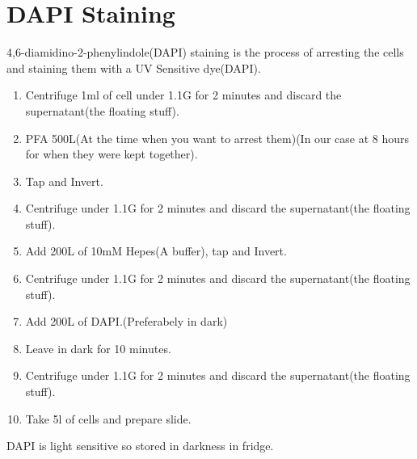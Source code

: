 \documentclass[11pt,twoside,a4paper]{article}
\begin{document}
\section{DAPI Staining}
4,6-diamidino-2-phenylindole(DAPI) staining is the process of arresting the cells and staining them with a UV Sensitive dye(DAPI).
\begin{enumerate}
	\item Centrifuge 1ml of cell under 1.1G for 2 minutes and discard the supernatant(the floating stuff).
	\item PFA 500\textmu{}L(At the time when you want to arrest them)(In our case at 8 hours for when they were kept together).
	\item Tap and Invert.
	\item Centrifuge under 1.1G for 2 minutes and discard the supernatant(the floating stuff).
	\item Add 200\textmu{}L of 10mM Hepes(A buffer), tap and Invert.
	\item Centrifuge under 1.1G for 2 minutes and discard the supernatant(the floating stuff).
	\item Add 200\textmu{}L of DAPI.(Preferabely in dark)
	\item Leave in dark for 10 minutes.
	\item Centrifuge under 1.1G for 2 minutes and discard the supernatant(the floating stuff).
	\item Take 5\textmu{}l of cells and prepare slide.
\end{enumerate}
DAPI is light sensitive so stored in darkness in fridge.
\end{document}
